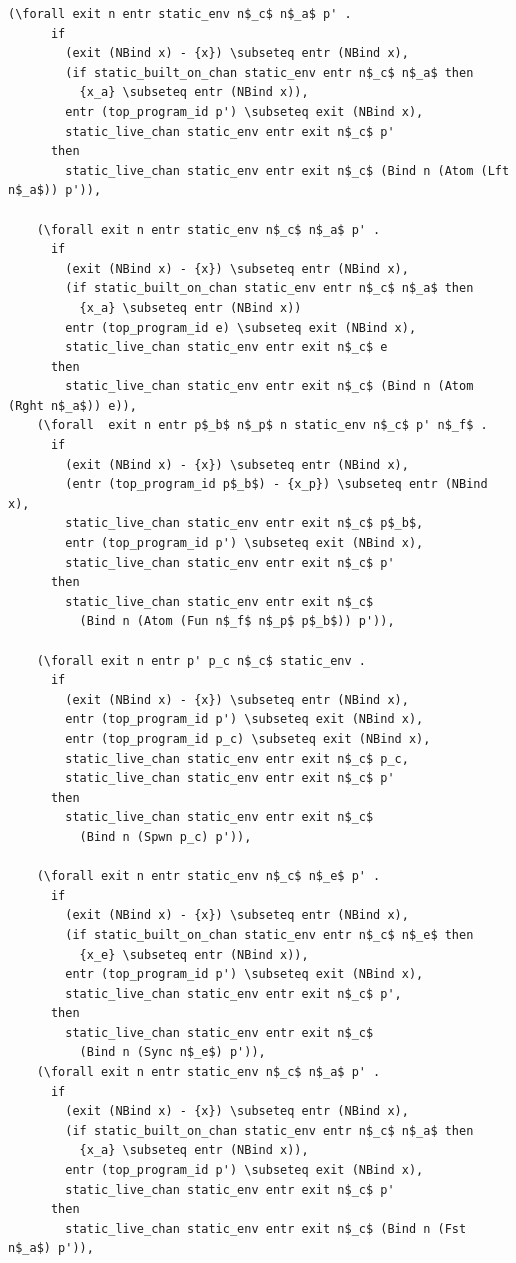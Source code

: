 \documentclass[10pt]{article}
\begin{document}
\begin{lstlisting}[language=logic, mathescape]
    (\forall exit n entr static_env n$_c$ n$_a$ p' . 
      if
        (exit (NBind x) - {x}) \subseteq entr (NBind x),
        (if static_built_on_chan static_env entr n$_c$ n$_a$ then
          {x_a} \subseteq entr (NBind x)),
        entr (top_program_id p') \subseteq exit (NBind x),
        static_live_chan static_env entr exit n$_c$ p'
      then
        static_live_chan static_env entr exit n$_c$ (Bind n (Atom (Lft n$_a$)) p')),

    (\forall exit n entr static_env n$_c$ n$_a$ p' . 
      if
        (exit (NBind x) - {x}) \subseteq entr (NBind x),
        (if static_built_on_chan static_env entr n$_c$ n$_a$ then
          {x_a} \subseteq entr (NBind x))
        entr (top_program_id e) \subseteq exit (NBind x),
        static_live_chan static_env entr exit n$_c$ e
      then
        static_live_chan static_env entr exit n$_c$ (Bind n (Atom (Rght n$_a$)) e)),
    (\forall  exit n entr p$_b$ n$_p$ n static_env n$_c$ p' n$_f$ . 
      if
        (exit (NBind x) - {x}) \subseteq entr (NBind x),
        (entr (top_program_id p$_b$) - {x_p}) \subseteq entr (NBind x),
        static_live_chan static_env entr exit n$_c$ p$_b$,
        entr (top_program_id p') \subseteq exit (NBind x),
        static_live_chan static_env entr exit n$_c$ p'
      then
        static_live_chan static_env entr exit n$_c$
          (Bind n (Atom (Fun n$_f$ n$_p$ p$_b$)) p')),

    (\forall exit n entr p' p_c n$_c$ static_env .
      if
        (exit (NBind x) - {x}) \subseteq entr (NBind x),
        entr (top_program_id p') \subseteq exit (NBind x),
        entr (top_program_id p_c) \subseteq exit (NBind x),
        static_live_chan static_env entr exit n$_c$ p_c,
        static_live_chan static_env entr exit n$_c$ p'
      then
        static_live_chan static_env entr exit n$_c$
          (Bind n (Spwn p_c) p')),

    (\forall exit n entr static_env n$_c$ n$_e$ p' .
      if
        (exit (NBind x) - {x}) \subseteq entr (NBind x),
        (if static_built_on_chan static_env entr n$_c$ n$_e$ then
          {x_e} \subseteq entr (NBind x)),
        entr (top_program_id p') \subseteq exit (NBind x),
        static_live_chan static_env entr exit n$_c$ p',
      then
        static_live_chan static_env entr exit n$_c$
          (Bind n (Sync n$_e$) p')),
    (\forall exit n entr static_env n$_c$ n$_a$ p' .
      if
        (exit (NBind x) - {x}) \subseteq entr (NBind x),
        (if static_built_on_chan static_env entr n$_c$ n$_a$ then
          {x_a} \subseteq entr (NBind x)),
        entr (top_program_id p') \subseteq exit (NBind x),
        static_live_chan static_env entr exit n$_c$ p'
      then
        static_live_chan static_env entr exit n$_c$ (Bind n (Fst n$_a$) p')),


\end{lstlisting}
\end{document}
